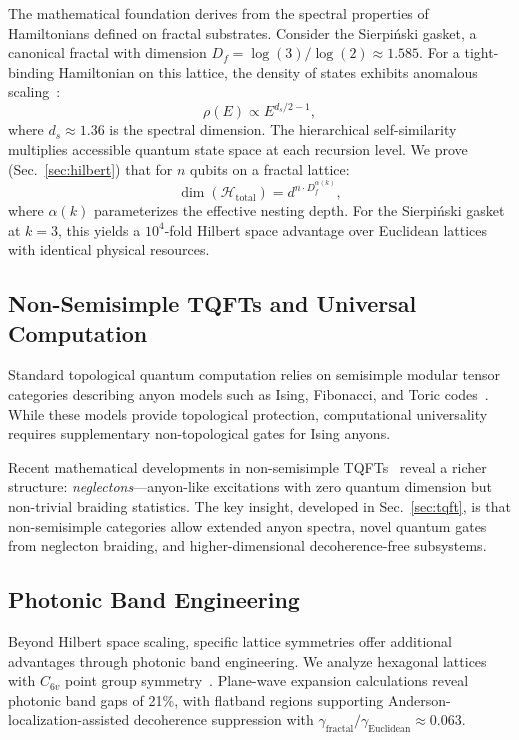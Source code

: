 \documentclass[aps,prx,twocolumn,groupedaddress,longbibliography]{revtex4-2}
\newcommand{\Hilbert}{\mathcal{H}}
\newcommand{\Df}{D_f}
\theoremstyle{plain}
\theoremstyle{definition}
\begin{document}
The mathematical foundation derives from the spectral properties of Hamiltonians defined on fractal substrates. Consider the Sierpi\'{n}ski gasket, a canonical fractal with dimension $\Df = \log(3)/\log(2) \approx 1.585$. For a tight-binding Hamiltonian on this lattice, the density of states exhibits anomalous scaling~\cite{Rammal1983,Alexander1982}:
\begin{equation}
\rho(E) \propto E^{d_s/2 - 1},
\end{equation}
where $d_s \approx 1.36$ is the spectral dimension. The hierarchical self-similarity multiplies accessible quantum state space at each recursion level. We prove (Sec.~\ref{sec:hilbert}) that for $n$ qubits on a fractal lattice:
\begin{equation}
\dim(\Hilbert_\mathrm{total}) = d^{n \cdot \Df^{\alpha(k)}},
\label{eq:scaling_preview}
\end{equation}
where $\alpha(k)$ parameterizes the effective nesting depth. For the Sierpi\'{n}ski gasket at $k = 3$, this yields a $10^4$-fold Hilbert space advantage over Euclidean lattices with identical physical resources.

\subsection{Non-Semisimple TQFTs and Universal Computation}

Standard topological quantum computation relies on semisimple modular tensor categories describing anyon models such as Ising, Fibonacci, and Toric codes~\cite{Kitaev2003,Nayak2008}. While these models provide topological protection, computational universality requires supplementary non-topological gates for Ising anyons.

Recent mathematical developments in non-semisimple TQFTs~\cite{Wen2017} reveal a richer structure: \emph{neglectons}---anyon-like excitations with zero quantum dimension but non-trivial braiding statistics. The key insight, developed in Sec.~\ref{sec:tqft}, is that non-semisimple categories allow extended anyon spectra, novel quantum gates from neglecton braiding, and higher-dimensional decoherence-free subsystems.

\subsection{Photonic Band Engineering}

Beyond Hilbert space scaling, specific lattice symmetries offer additional advantages through photonic band engineering. We analyze hexagonal lattices with $C_{6v}$ point group symmetry~\cite{Yablonovitch1987,John1987}. Plane-wave expansion calculations reveal photonic band gaps of 21\%, with flatband regions supporting Anderson-localization-assisted decoherence suppression with $\gamma_\mathrm{fractal}/\gamma_\mathrm{Euclidean} \approx 0.063$.
\end{document}
